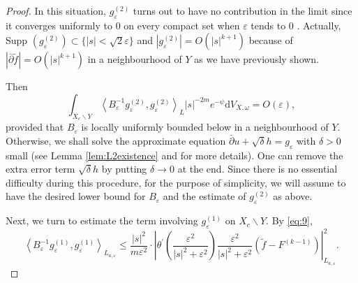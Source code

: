 \documentclass[lang=en,12pt,twoside]{textbook}
\begin{document}
\begin{proof}
In this situation, $g_{\varepsilon}^{(2)}$ turns out to have no contribution in the limit since it converges uniformly to 0 on every compact set when $\varepsilon$ tends to 0 . Actually, Supp $\left(g_{\varepsilon}^{(2)}\right) \subset\{|s|<\sqrt{2} \varepsilon\}$ and $\left|g_{\varepsilon}^{(2)}\right|=O\left(|s|^{k+1}\right)$ because of $|\bar{\partial} \widetilde{f}|=O\left(|s|^{k+1}\right)$ in a neighbourhood of $Y$ as we have previously shown.


Then
$$
\int_{X_c \backslash Y}\left\langle B_{\varepsilon}^{-1} g_{\varepsilon}^{(2)}, g_{\varepsilon}^{(2)}\right\rangle_L|s|^{-2m} e^{-\psi}\mathrm{d} V_{X, \omega}=O(\varepsilon),
$$
provided that $B_{\varepsilon}$ is locally uniformly bounded below in a neighbourhood of $Y$. Otherwise, we shall solve the approximate equation $\bar{\partial} u+\sqrt{\delta} h=g_{\varepsilon}$ with $\delta>0$ small (see Lemma \ref{lem:L2existence} and \cite[Remark 3.2]{Demailly2000} for more details). One can remove the extra error term $\sqrt{\delta} h$ by putting $\delta \rightarrow 0$ at the end. Since there is no essential difficulty during this procedure, for the purpose of simplicity, we will assume to have the desired lower bound for $B_{\varepsilon}$ and the estimate of $g_{\varepsilon}^{(2)}$ as above.

Next, we turn to estimate the term involving $g_{\varepsilon}^{(1)}$ on $X_c \backslash Y$. By \eqref{eq:9},
{\color{purple} $$
\left\langle B_{\varepsilon}^{-1} g_{\varepsilon}^{(1)}, g_{\varepsilon}^{(1)}\right\rangle_{L_{a, \varepsilon}} \leq \frac{|s|^2}{m \varepsilon^2} \cdot\left|\theta^{\prime}\left(\frac{\varepsilon^2}{|s|^2+\varepsilon^2}\right) \frac{\varepsilon^2}{|s|^2+\varepsilon^2}\left(\tilde{f}-F^{(k-1)}\right)\right|_{L_{a, \varepsilon}}^2 .
$$}


\end{proof}
\end{document}
